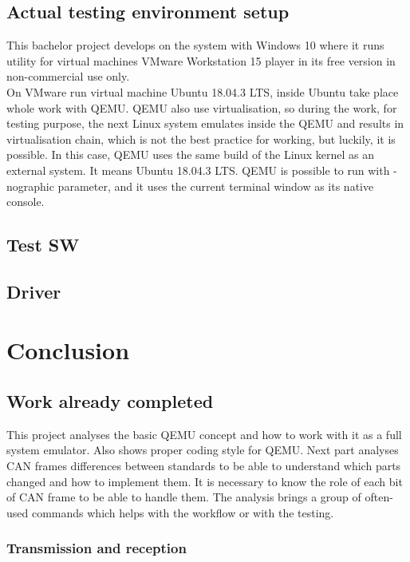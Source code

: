 \documentclass{ctuthesis}
\begin{document}
 \section{Actual testing environment setup}
  This bachelor project develops on the system with Windows 10 where it runs utility for virtual machines VMware  Workstation 15 player in its free version in non-commercial use only. \cite{vmware} \\
  On VMware run virtual machine Ubuntu 18.04.3 LTS, \cite{ubuntu} inside Ubuntu take place whole work with QEMU. QEMU also use virtualisation, so during the work, for testing purpose, the next Linux system emulates inside the QEMU and results in virtualisation chain, which is not the best practice for working, but luckily, it is possible. In this case, QEMU uses the same build of the Linux kernel as an external system. It means Ubuntu 18.04.3 LTS. QEMU is possible to run with -nographic parameter, and it uses the current terminal window as its native console. \\

 \section{Test SW}
 
 \section{Driver}
 
\chapter{Conclusion}

 \section{Work already completed}
  This project analyses the basic QEMU concept and how to work with it as a full system emulator. Also shows proper coding style for QEMU.  Next part analyses CAN frames differences between standards to be able to understand which parts changed and how to implement them. It is necessary to know the role of each bit of CAN frame to be able to handle them. The analysis brings a group of often-used commands which helps with the workflow or with the testing.
 
 \subsection{Transmission and reception}
\end{document}
